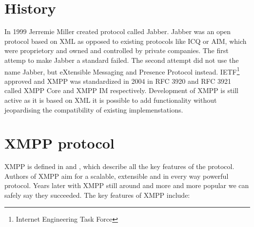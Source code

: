 \section{History}
In 1999 Jerremie Miller created protocol called Jabber. Jabber was an open protocol based on XML as opposed to existing protocols like ICQ\cite{ICQ} or AIM\cite{AIM}, which were proprietory and owned and controlled by private companies. The first attemp to make Jabber a standard failed. The second attempt did not use the name Jabber, but eXtensible Messaging and Presence Protocol instead. IETF\footnote{Internet Engineering Task Force} approved and XMPP was standardized in 2004 in RFC 3920 and RFC 3921 called XMPP Core and XMPP IM respectively. Development of XMPP is still active as it is based on XML it is possible to add functionality without jeopardising the compatibility of existing implemenstations.      

\section{XMPP protocol}
XMPP is defined in \cite{xmppCoreRFC} and \cite{xmppIMRFC}, which describe all the key features of the protocol. Authors of XMPP aim for a scalable, extensible and in every way powerful protocol. Years later with XMPP still around and more and more popular we can safely say they succeeded. The key features of XMPP include:

